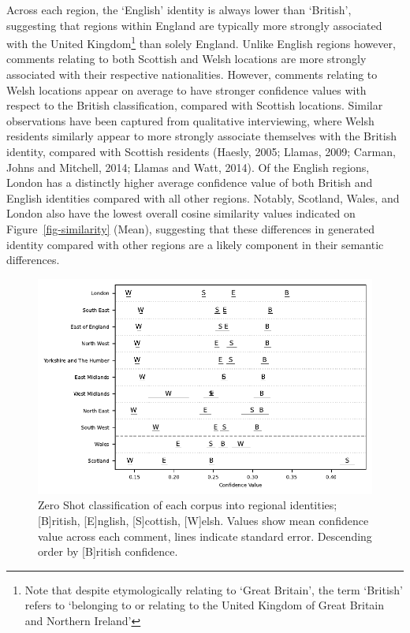 \documentclass[
  letterpaper,
  11pt,
  english,
  onehalfspacing,
  headsepline]{MastersDoctoralThesis}
\begin{document}
Across each region, the `English' identity is always lower than
`British', suggesting that regions within England are typically more
strongly associated with the United Kingdom\footnote{Note that despite
  etymologically relating to `Great Britain', the term `British' refers
  to `belonging to or relating to the United Kingdom of Great Britain
  and Northern Ireland'} than solely England. Unlike English regions
however, comments relating to both Scottish and Welsh locations are more
strongly associated with their respective nationalities. However,
comments relating to Welsh locations appear on average to have stronger
confidence values with respect to the British classification, compared
with Scottish locations. Similar observations have been captured from
qualitative interviewing, where Welsh residents similarly appear to more
strongly associate themselves with the British identity, compared with
Scottish residents (Haesly, 2005; Llamas, 2009; Carman, Johns and
Mitchell, 2014; Llamas and Watt, 2014). Of the English regions, London
has a distinctly higher average confidence value of both British and
English identities compared with all other regions. Notably, Scotland,
Wales, and London also have the lowest overall cosine similarity values
indicated on Figure~\ref{fig-similarity} (Mean), suggesting that these
differences in generated identity compared with other regions are a
likely component in their semantic differences.

\begin{figure}

{\centering \includegraphics{05_footprint/05_figures/fig-identity-output-1.pdf}

}

\caption{\label{fig-identity}Zero Shot classification of each corpus
into regional identities; {[}B{]}ritish, {[}E{]}nglish, {[}S{]}cottish,
{[}W{]}elsh. Values show mean confidence value across each comment,
lines indicate standard error. Descending order by {[}B{]}ritish
confidence.}

\end{figure}
\end{document}
